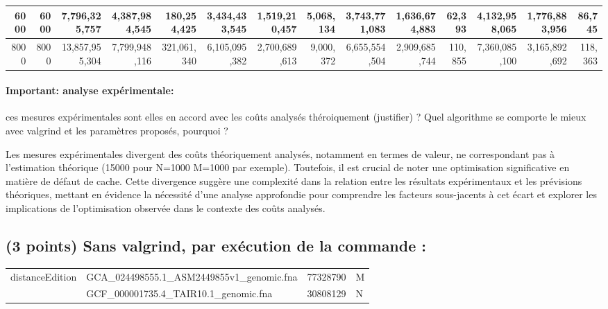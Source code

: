 \documentclass[10pt,a4paper]{article}
\begin{document}
{\begin{tabular}{|r|r||r|r|r||r|r|r||r|r|r||r|r|r||}
\\ \hline
6000 & 6000 
&7,796,325,757  & 4,387,984,545 & 180,254,425  %
& 3,434,433,545 & 1,519,210,457 &  5,068,134 %
& 3,743,771,083 & 1,636,674,883 & 62,393 %
& 4,132,958,065 & 1,776,883,956 & 86,745  %
\\ \hline
8000 & 8000 
& 13,857,955,304 & 7,799,948,116 & 321,061,340  %
& 6,105,095,382 & 2,700,689,613 &  9,000,372 %
&  6,655,554,504 & 2,909,685,744 & 110,855  %
& 7,360,085,100 & 3,165,892,692 & 118,363  %
\\ \hline
\hline
\end{tabular}
}

\paragraph{Important: analyse expérimentale:} 
ces mesures expérimentales sont elles en accord avec les coûts analysés théroiquement (justifier)  ? 
Quel algorithme se comporte le mieux avec valgrind et 
les paramètres proposés, pourquoi ?
\vspace*{1.0cm}

Les mesures expérimentales divergent des coûts théoriquement analysés, notamment en termes de valeur, ne correspondant pas à l'estimation théorique (15000 pour N=1000 M=1000 par exemple). Toutefois, il est crucial de noter une optimisation significative en matière de défaut de cache. Cette divergence suggère une complexité dans la relation entre les résultats expérimentaux et les prévisions théoriques, mettant en évidence la nécessité d'une analyse approfondie pour comprendre les facteurs sous-jacents à cet écart et explorer les implications de l'optimisation observée dans le contexte des coûts analysés.

\subsection{(3 points) Sans valgrind, par exécution de la commande :}
{\tt \begin{tabular}{llll}
distanceEdition & GCA\_024498555.1\_ASM2449855v1\_genomic.fna & 77328790 & M \\
                & GCF\_000001735.4\_TAIR10.1\_genomic.fna     & 30808129 & N
\end{tabular}}
\end{document}
